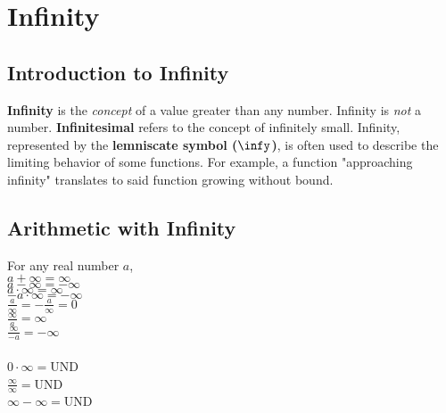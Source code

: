 \section{Infinity}

    \subsection{Introduction to Infinity}
        \textbf{Infinity} is the \textit{concept} of a value greater than any number.
        Infinity is \textit{not} a number. \textbf{Infinitesimal} refers to the concept of
        infinitely small. Infinity, represented by the \textbf{lemniscate symbol ($\infy$)}, is
        often used to describe the limiting behavior of some functions. For example, a function
        "approaching infinity" translates to said function growing without bound.



    \subsection{Arithmetic with Infinity}
        For any real number $a$, \\
        $a+\infty=\infty$ \\
        $a-\infty=-\infty$ \\
        $a\cdot\infty=\infty$ \\
        $-a\cdot\infty=-\infty$ \\
        $\frac{a}{\infty}=-\frac{a}{\infty}=0$ \\
        $\frac{\infty}{a}=\infty$ \\
        $\frac{\infty}{-a}=-\infty$ \\
        \\
        $0\cdot\infty=$UND \\
        $\frac{\infty}{\infty}=$UND \\
        $\infty-\infty =$UND \\